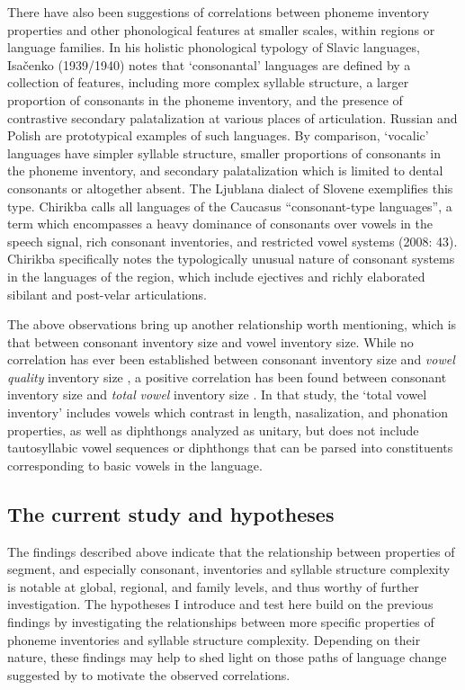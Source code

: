   There have also been suggestions of correlations between phoneme inventory properties and other phonological features at smaller scales, within regions or language families. In his holistic phonological typology of Slavic languages, Isačenko (1939/1940) notes that ‘consonantal’ languages are defined by a collection of features, including more complex syllable structure, a larger proportion of consonants in the phoneme inventory, and the presence of contrastive secondary palatalization at various places of articulation. Russian and Polish are prototypical examples of such languages. By comparison, ‘vocalic’ languages have simpler syllable structure, smaller proportions of consonants in the phoneme inventory, and secondary palatalization which is limited to dental consonants or altogether absent. The Ljublana dialect of Slovene exemplifies this type. Chirikba calls all languages of the Caucasus “consonant-type languages”, a term which encompasses a heavy dominance of consonants over vowels in the speech signal, rich consonant inventories, and restricted vowel systems (2008: 43). Chirikba specifically notes the typologically unusual nature of consonant systems in the languages of the region, which include ejectives and richly elaborated sibilant and post-velar articulations.

  The above observations bring up another relationship worth mentioning, which is that between consonant inventory size and vowel inventory size. While no correlation has ever been established between consonant inventory size and \textit{vowel} \textit{quality} inventory size \citep{Maddieson2013c}, a positive correlation has been found between consonant inventory size and \textit{total} \textit{vowel} inventory size \citep{Maddieson2011}. In that study, the ‘total vowel inventory’ includes vowels which contrast in length, nasalization, and phonation properties, as well as diphthongs analyzed as unitary, but does not include tautosyllabic vowel sequences or diphthongs that can be parsed into constituents corresponding to basic vowels in the language.

\subsection{The current study and hypotheses}\label{sec:4.1.4}

  The findings described above indicate that the relationship between properties of segment, and especially consonant, inventories and syllable structure complexity is notable at global, regional, and family levels, and thus worthy of further investigation. The hypotheses I introduce and test here build on the previous findings by investigating the relationships between more specific properties of phoneme inventories and syllable structure complexity. Depending on their nature, these findings may help to shed light on those paths of language change suggested by \citet{Maddieson2006} to motivate the observed correlations.

